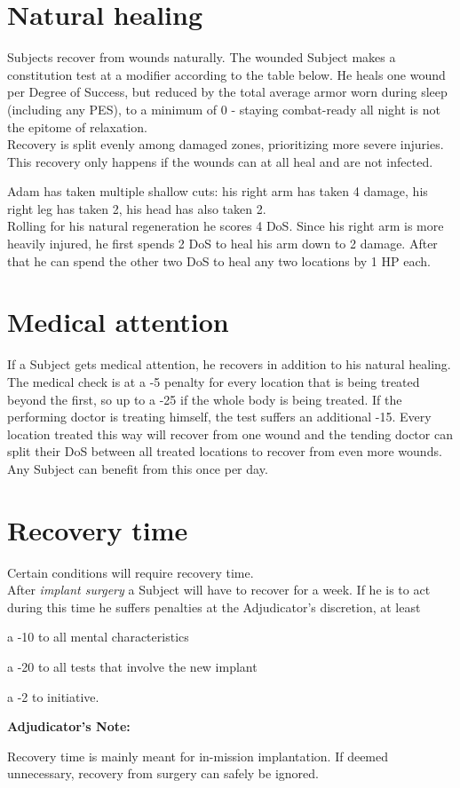 \documentclass[11pt,a4paper,openany,dvipsnames]{book}
\begin{document}
	\section{Natural healing}
	Subjects recover from wounds naturally.
	The wounded Subject makes a constitution test at a modifier according to the table below.
	He heals one wound per Degree of Success,
		but reduced by the total average armor worn during sleep (including any PES),
		to a minimum of 0 - staying combat-ready all night is not the epitome of relaxation.
	\\%
	Recovery is split evenly among damaged zones, prioritizing more severe injuries. This recovery only happens if the wounds can at all heal and are not infected.
	\begin{exampleblock}
		Adam has taken multiple shallow cuts:
			his right arm has taken 4 damage,
			his right leg has taken 2,
			his head has also taken 2.
		\\%
		Rolling for his natural regeneration he scores 4 DoS.
		Since his right arm is more heavily injured,
			he first spends 2 DoS to heal his arm down to 2 damage.
		After that he can spend the other two DoS to heal
			any two locations
			by 1 HP each.
	\end{exampleblock}
	\section{Medical attention}
	If a Subject gets medical attention,
		he recovers in addition to his natural healing.
	The medical check is at a -5 penalty
		for every location that is being treated beyond the first,
		so up to a -25 if the whole body is being treated.
	If the performing doctor is treating himself,
		the test suffers an additional \mbox{-15}. %
	Every location treated this way will recover from one wound
		and the tending doctor can split their DoS
		between all treated locations to recover from even more wounds.
	Any Subject can benefit from this once per day.
	\pagebreak%
	\section{Recovery time}
	\label{sec:recovery}
	Certain conditions will require recovery time.\\
	After \emph{implant surgery} a Subject will have to recover for a week.
	If he is to act during this time he suffers penalties at the Adjudicator's discretion, at least
	\begin{sitemize}
		\item a -10 to all mental characteristics
		\item a -20 to all tests that involve the new implant
		\item a -2 to initiative.
	\end{sitemize}
	\begin{exampleblock}
		\textbf{Adjudicator's Note:}
		\par
		Recovery time is mainly meant for in-mission implantation.
		If deemed unnecessary, recovery from surgery can safely be ignored.
	\end{exampleblock}
\end{document}
